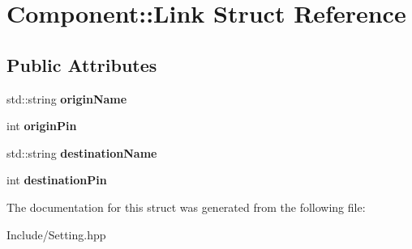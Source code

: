 \hypertarget{structComponent_1_1Link}{}\section{Component\+:\+:Link Struct Reference}
\label{structComponent_1_1Link}
\subsection*{Public Attributes}
\begin{DoxyCompactItemize}
\item 
\mbox{\label{structComponent_1_1Link_accffc50390a67907efb220216015f722}} 
std\+::string {\bfseries origin\+Name}
\item 
\mbox{\label{structComponent_1_1Link_a5f908953b3647fec16089d77d8dcde77}} 
int {\bfseries origin\+Pin}
\item 
\mbox{\label{structComponent_1_1Link_a200f1974ba4ae45e0bb944072f787239}} 
std\+::string {\bfseries destination\+Name}
\item 
\mbox{\label{structComponent_1_1Link_a1042e582b5c3e7163b1b7c9a626c3d8f}} 
int {\bfseries destination\+Pin}
\end{DoxyCompactItemize}


The documentation for this struct was generated from the following file\+:\begin{DoxyCompactItemize}
\item 
Include/Setting.\+hpp\end{DoxyCompactItemize}
